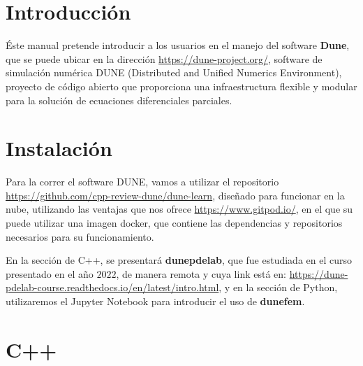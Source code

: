 \documentclass{scrarticle}
\begin{document}
\section{Introducción}
Éste manual pretende introducir a los usuarios en el manejo del software \textbf{Dune}, 
que se puede ubicar en la dirección 
\url{https://dune-project.org/}, software de simulación numérica DUNE (Distributed and Unified Numerics Environment), 
proyecto de código abierto que proporciona una infraestructura flexible y 
modular para la solución de ecuaciones diferenciales parciales.

\section{Instalación}

Para la correr el software DUNE, vamos a utilizar el repositorio \url{https://github.com/cpp-review-dune/dune-learn},
diseñado para funcionar en la nube, utilizando las ventajas que nos ofrece \url{https://www.gitpod.io/}, en el 
que su puede utilizar una imagen docker, que contiene las dependencias y repositorios necesarios para su funcionamiento.

En la sección de C++, se presentará \textbf{dunepdelab}, que fue estudiada en el curso presentado en el año 
$2022$, de manera remota y cuya link está en: \url{https://dune-pdelab-course.readthedocs.io/en/latest/intro.html},
y en la sección de Python, utilizaremos el Jupyter Notebook para introducir el uso de \textbf{dunefem}.
\section{C++}
\end{document}
